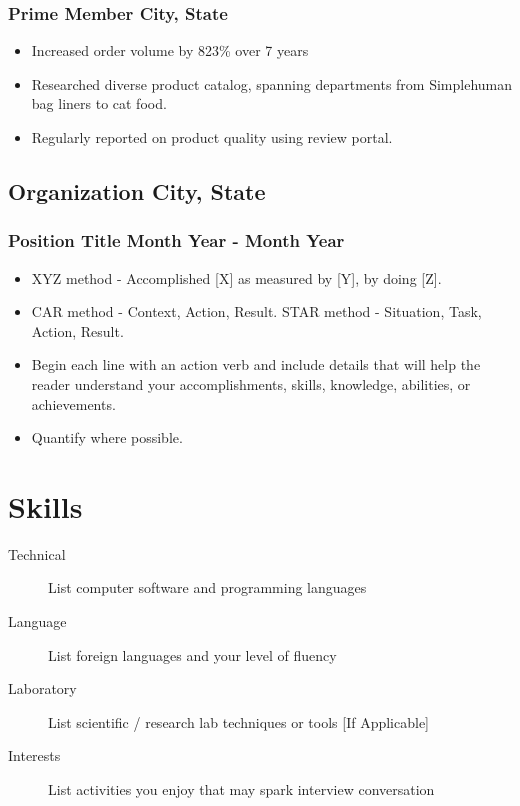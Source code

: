 \documentclass[11pt]{article}
\begin{document}
\subsubsection{Prime Member \hfill City, State}
\begin{itemize}
    \item Increased order volume by 823\% over 7 years 
    \item Researched diverse product catalog, spanning departments from Simplehuman bag liners to cat food. 
    \item Regularly reported on product quality using review portal.
\end{itemize}

\subsection{Organization \hfill City, State}
\subsubsection{Position Title \hfill Month Year - Month Year}
\begin{itemize}
    \item XYZ method - Accomplished [X] as measured by [Y], by doing [Z].
    \item CAR method - Context, Action, Result. STAR method - Situation, Task, Action, Result.
    \item Begin each line with an action verb and include details that will help the reader understand your accomplishments, skills, knowledge, abilities, or achievements.
    \item Quantify where possible.
\end{itemize}

\section{Skills}
\begin{description}
    \item[Technical] List computer software and programming languages 
    \item[Language] List foreign languages and your level of fluency
    \item[Laboratory] List scientific / research lab techniques or tools [If Applicable]
    \item[Interests] List activities you enjoy that may spark interview conversation
\end{description}
\end{document}
